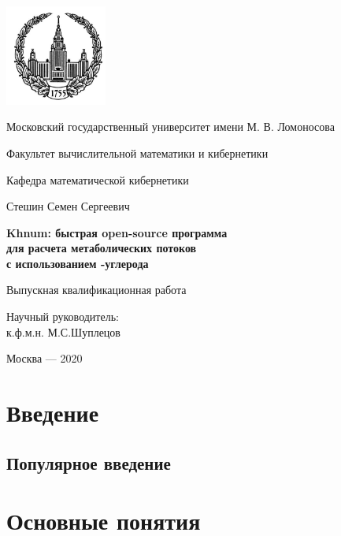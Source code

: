 \documentclass[a4paper, 12pt, left=30mm, right=15mm, top=20mm, bottom=20mm]{report}
\begin{document}
\begin{titlepage}

	\begin{centering}
		\includegraphics[width=0.25\textwidth]{logo.png}\par
	\end{centering}
	\centerline{Московский государственный университет имени М. В. Ломоносова}
	\centerline{Факультет вычислительной математики и кибернетики}
	\centerline{Кафедра математической кибернетики}
	\centerline{\hfill\hrulefill\hrulefill\hfill}
	\vfill
	\vfill
	\large
	\centerline{Стешин Семен Сергеевич}
	\vfill
	\Large
	\begin{centering}
		\textbf{Khnum: быстрая open-source программа \\ для расчета метаболических потоков \\ с использованием -углерода}
		
	\end{centering}
	\normalsize
	\vfill
	\centerline{Выпускная квалификационная работа}
	\vfill
	\vfill
	\begin{flushright}
	Научный руководитель:\\
	к.ф.м.н. М.С.Шуплецов
	\end{flushright}
	\vfill
	\vfill
	\centerline{Москва --- 2020}

\end{titlepage}



\begin{abstract}
\blindtext
\end{abstract}

\tableofcontents

\chapter{Введение}
\section{Популярное введение}
\blindtext

\chapter{Основные понятия}
\end{document}
